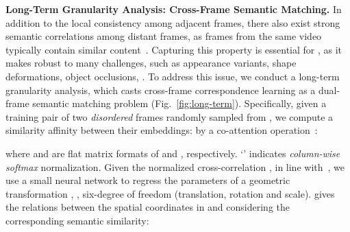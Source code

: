 \documentclass[10pt,twocolumn,letterpaper]{article}
\begin{document}
\noindent\textbf{Long-Term Granularity Analysis: Cross-Frame Semantic Matching.} In addition to the local consistency among adjacent frames, there also exist strong semantic correlations among distant frames, as frames from the same video typically contain similar
content~\!\cite{Hossein2009,yan2019fine}. Capturing this property is essential for , as it makes  robust to many challenges, such as appearance variants, shape deformations, object occlusions, \etc. To address this issue, we conduct a long-term granularity analysis, which casts cross-frame correspondence learning as a dual-frame semantic matching problem (Fig.~\!\ref{fig:long-term}). Specifically, given a training pair of two \textit{disordered} frames  randomly sampled from , we compute a similarity affinity  between their embeddings:  by a co-attention operation~\!\cite{DBLP:conf/nips/VaswaniSPUJGKP17}:
\vspace{-1pt}

where  and  are flat matrix formats of  and , respectively. `' indicates \textit{column-wise softmax} normalization.
Given the normalized cross-correlation , in line with~\!\cite{rocco2018end}, we use a small neural network  to regress the parameters of a geometric transformation , \ie, six-degree of freedom (translation, rotation and scale).  gives the relations between the spatial coordinates in  and  considering the corresponding semantic similarity:
\vspace{-2pt}
\end{document}
